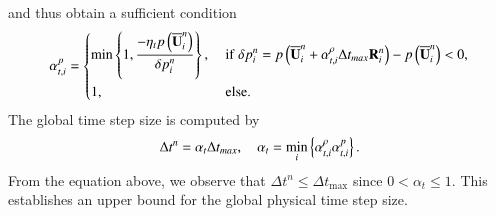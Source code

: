 and thus obtain a sufficient condition
\begin{equation}
\label{eq:alpha-t-p}
    \alpha_{t,i}^{p} = \begin{dcases}
        \min\left\{1, \dfrac{-\eta_t p \left(\UM^n_i\right)}{\delta p_i^n} \right\}, & \ 
        \mathrm{if} \ \delta p_i^n=  p \left(\UM^n_i + \alpha_{t,i}^{\rho} \inc t_{max} \R^n_i\right) -  p \left(\UM^n_i\right) <0, \\
        1, & \ \mathrm{else}.
    \end{dcases}
\end{equation}
The global time step size is computed by
\begin{equation}
    \label{eq:alpha-t-global}
    \mathrm\Delta t^n = \alpha_t \mathrm\Delta t_{max}, \quad \alpha_t = \min_i \left\{\alpha_{t,i}^{\rho}\alpha_{t,i}^{p} \right\}.
\end{equation}
From the equation above, we observe that $\Delta t^n \leq \Delta t_{\text{max}}$ since $0 < \alpha_t \leq 1$. This establishes an upper bound for the global physical time step size.

